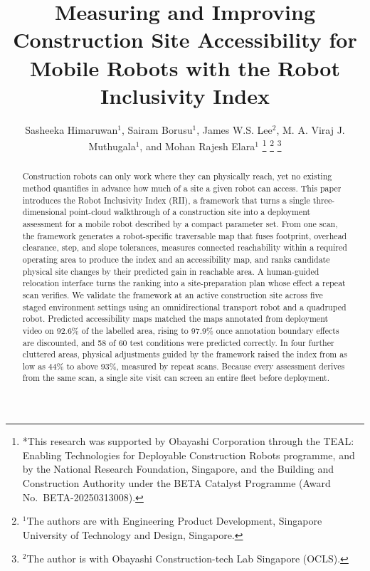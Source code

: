 \documentclass[a4paper, 10pt, conference]{ieeeconf}
\begin{document}
\title{Measuring and Improving Construction Site Accessibility for Mobile Robots with the Robot Inclusivity Index}

\author{Sasheeka Himaruwan$^{1}$, Sairam Borusu$^{1}$, James W.S. Lee$^{2}$, M. A. Viraj J. Muthugala$^{1}$, and Mohan Rajesh Elara$^{1}$%
\thanks{*This research was supported by Obayashi Corporation through the TEAL: Enabling Technologies for Deployable Construction Robots programme, and by the National Research Foundation, Singapore, and the Building and Construction Authority under the BETA Catalyst Programme (Award No.\ BETA-20250313008).}%
\thanks{$^{1}$The authors are with Engineering Product Development, Singapore University of Technology and Design, Singapore.}%
\thanks{$^{2}$The author is with Obayashi Construction-tech Lab Singapore (OCLS).}%
}

\maketitle

\begin{abstract}
Construction robots can only work where they can physically reach, yet no existing method quantifies in advance how much of a site a given robot can access. This paper introduces the Robot Inclusivity Index (RII), a framework that turns a single three-dimensional point-cloud walkthrough of a construction site into a deployment assessment for a mobile robot described by a compact parameter set. From one scan, the framework generates a robot-specific traversable map that fuses footprint, overhead clearance, step, and slope tolerances, measures connected reachability within a required operating area to produce the index and an accessibility map, and ranks candidate physical site changes by their predicted gain in reachable area. A human-guided relocation interface turns the ranking into a site-preparation plan whose effect a repeat scan verifies. We validate the framework at an active construction site across five staged environment settings using an omnidirectional transport robot and a quadruped robot. Predicted accessibility maps matched the maps annotated from deployment video on 92.6\% of the labelled area, rising to 97.9\% once annotation boundary effects are discounted, and 58 of 60 test conditions were predicted correctly. In four further cluttered areas, physical adjustments guided by the framework raised the index from as low as 44\% to above 93\%, measured by repeat scans. Because every assessment derives from the same scan, a single site visit can screen an entire fleet before deployment.
\end{abstract}
\end{document}
